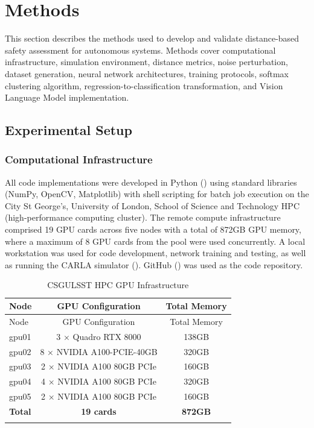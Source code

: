 \chapter{Methods}
\label{chap:methods}

This section describes the methods used to develop and validate distance-based safety assessment for autonomous systems. Methods cover computational infrastructure, simulation environment, distance metrics, noise perturbation, dataset generation, neural network architectures, training protocols, softmax clustering algorithm, regression-to-classification transformation, and Vision Language Model implementation.

\section{Experimental Setup}

\subsection{Computational Infrastructure}
\label{methods:hardware}

All code implementations were developed in Python (\cite{python}) using standard libraries (NumPy, OpenCV, Matplotlib) with shell scripting for batch job execution on the City St George's, University of London, School of Science and Technology HPC (high-performance computing cluster). The remote compute infrastructure comprised 19 GPU cards across five nodes with a total of 872GB GPU memory, where a maximum of 8 GPU cards from the pool were used concurrently. A local workstation was used for code development, network training and testing, as well as running the CARLA simulator (\cite{dosovitskiy17}). GitHub (\cite{github}) was used as the code repository.

\begin{longtable}{@{}lcc@{}}
\toprule
Node & GPU Configuration & Total Memory \\
\midrule
\endfirsthead
\toprule
Node & GPU Configuration & Total Memory \\
\midrule
\endhead
gpu01 & 3 × Quadro RTX 8000 & 138GB \\
gpu02 & 8 × NVIDIA A100-PCIE-40GB & 320GB \\
gpu03 & 2 × NVIDIA A100 80GB PCIe & 160GB \\
gpu04 & 4 × NVIDIA A100 80GB PCIe & 320GB \\
gpu05 & 2 × NVIDIA A100 80GB PCIe & 160GB \\
\midrule
\textbf{Total} & \textbf{19 cards} & \textbf{872GB} \\
\bottomrule
\caption{CSGULSST HPC GPU Infrastructure}
\label{tab:hpc_hardware}
\end{longtable}

